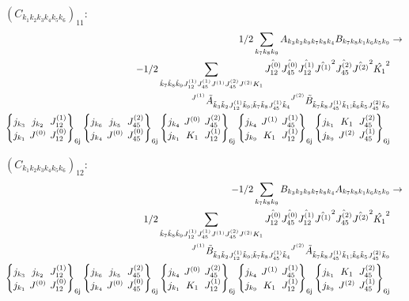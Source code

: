 \documentclass[11pt]{article}
\newcommand{\sixj}[6]{\begingroup\setlength{\arraycolsep}{0.2em}\begin{Bmatrix} #1 & #2 & #3 \\ #4 & #5 & #6 \end{Bmatrix}_{\text{6j}}\endgroup}
\begin{document}
$\left({C}_{{k}_{1}{k}_{2}{k}_{3}{k}_{4}{k}_{5}{k}_{6}}\right)_{11}$:
\begin{align}
1/2\sum_{{k}_{7}{k}_{8}{k}_{9}}{A}_{{k}_{3}{k}_{2}{k}_{9}{k}_{7}{k}_{8}{k}_{4}}{B}_{{k}_{7}{k}_{8}{k}_{1}{k}_{6}{k}_{5}{k}_{9}}&\rightarrow \notag \\-1/2\sum_{\tilde{k}_{7}\tilde{k}_{8}\tilde{k}_{9}J^{(1)}_{12}J^{(1)}_{45}J^{(1)}J^{(2)}_{45}J^{(2)}K_{1}}\hat{J^{(0)}_{12}}\hat{J^{(0)}_{45}}\hat{J^{(1)}_{12}}\hat{J^{(1)}}^{2}\hat{J^{(2)}_{45}}\hat{J^{(2)}}^{2}\hat{K_{1}}^{2}& \notag \\{}^{J^{(1)}}\tilde{A}_{\tilde{k}_{3}\tilde{k}_{2}J^{(1)}_{12}\tilde{k}_{9};\tilde{k}_{7}\tilde{k}_{8}J^{(1)}_{45}\tilde{k}_{4}}{}^{J^{(2)}}\tilde{B}_{\tilde{k}_{7}\tilde{k}_{8}J^{(1)}_{45}\tilde{k}_{1};\tilde{k}_{6}\tilde{k}_{5}J^{(2)}_{45}\tilde{k}_{9}}& \notag \\\sixj{j_{{k}_{3}}}{j_{{k}_{2}}}{J^{(1)}_{12}}{j_{{k}_{1}}}{J^{(0)}}{J^{(0)}_{12}}\sixj{j_{{k}_{6}}}{j_{{k}_{5}}}{J^{(2)}_{45}}{j_{{k}_{4}}}{J^{(0)}}{J^{(0)}_{45}}\sixj{j_{{k}_{4}}}{J^{(0)}}{J^{(2)}_{45}}{j_{{k}_{1}}}{K_{1}}{J^{(1)}_{12}}\sixj{j_{{k}_{4}}}{J^{(1)}}{J^{(1)}_{45}}{j_{{k}_{9}}}{K_{1}}{J^{(1)}_{12}}\sixj{j_{{k}_{1}}}{K_{1}}{J^{(2)}_{45}}{j_{{k}_{9}}}{J^{(2)}}{J^{(1)}_{45}}
\end{align}

$\left({C}_{{k}_{1}{k}_{2}{k}_{3}{k}_{4}{k}_{5}{k}_{6}}\right)_{12}$:
\begin{align}
-1/2\sum_{{k}_{7}{k}_{8}{k}_{9}}{B}_{{k}_{3}{k}_{2}{k}_{9}{k}_{7}{k}_{8}{k}_{4}}{A}_{{k}_{7}{k}_{8}{k}_{1}{k}_{6}{k}_{5}{k}_{9}}&\rightarrow \notag \\1/2\sum_{\tilde{k}_{7}\tilde{k}_{8}\tilde{k}_{9}J^{(1)}_{12}J^{(1)}_{45}J^{(1)}J^{(2)}_{45}J^{(2)}K_{1}}\hat{J^{(0)}_{12}}\hat{J^{(0)}_{45}}\hat{J^{(1)}_{12}}\hat{J^{(1)}}^{2}\hat{J^{(2)}_{45}}\hat{J^{(2)}}^{2}\hat{K_{1}}^{2}& \notag \\{}^{J^{(1)}}\tilde{B}_{\tilde{k}_{3}\tilde{k}_{2}J^{(1)}_{12}\tilde{k}_{9};\tilde{k}_{7}\tilde{k}_{8}J^{(1)}_{45}\tilde{k}_{4}}{}^{J^{(2)}}\tilde{A}_{\tilde{k}_{7}\tilde{k}_{8}J^{(1)}_{45}\tilde{k}_{1};\tilde{k}_{6}\tilde{k}_{5}J^{(2)}_{45}\tilde{k}_{9}}& \notag \\\sixj{j_{{k}_{3}}}{j_{{k}_{2}}}{J^{(1)}_{12}}{j_{{k}_{1}}}{J^{(0)}}{J^{(0)}_{12}}\sixj{j_{{k}_{6}}}{j_{{k}_{5}}}{J^{(2)}_{45}}{j_{{k}_{4}}}{J^{(0)}}{J^{(0)}_{45}}\sixj{j_{{k}_{4}}}{J^{(0)}}{J^{(2)}_{45}}{j_{{k}_{1}}}{K_{1}}{J^{(1)}_{12}}\sixj{j_{{k}_{4}}}{J^{(1)}}{J^{(1)}_{45}}{j_{{k}_{9}}}{K_{1}}{J^{(1)}_{12}}\sixj{j_{{k}_{1}}}{K_{1}}{J^{(2)}_{45}}{j_{{k}_{9}}}{J^{(2)}}{J^{(1)}_{45}}
\end{align}
\end{document}
